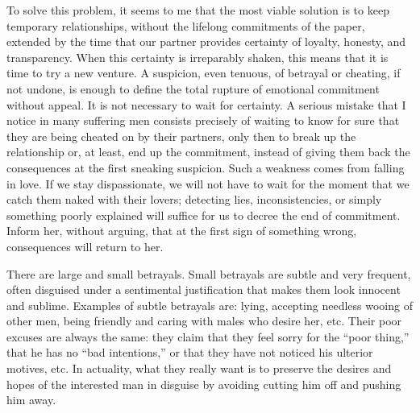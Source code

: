 \par To solve this problem, it seems to me that the most viable solution is to keep temporary relationships, without the lifelong commitments of the paper\footnotemark[22], extended by the time that our partner provides certainty of loyalty, honesty, and transparency\footnotemark[23]. When this certainty is irreparably shaken\footnotemark[24], this means that it is time to try a new venture. A suspicion, even tenuous\footnotemark[25], of betrayal or cheating, if not undone, is enough to define the total rupture of emotional commitment without appeal. It is not necessary to wait for certainty. A serious mistake that I notice in many suffering men consists precisely of waiting to know for sure that they are being cheated on by their partners, only then to break up the relationship or, at least, end up the commitment, instead of giving them back the consequences at the first sneaking suspicion. Such a weakness comes from falling in love. If we stay dispassionate, we will not have to wait for the moment that we catch them naked with their lovers; detecting lies, inconsistencies, or simply something poorly explained will suffice for us to decree the end of commitment. Inform her, without arguing, that at the first sign of something wrong, consequences will return to her.





\par There are large and small betrayals. Small betrayals are subtle and very frequent, often disguised under a sentimental justification that makes them look innocent and sublime. Examples of subtle betrayals are: lying, accepting needless wooing of other men, being friendly and caring with males who desire her, etc. Their poor excuses are always the same: they claim that they feel sorry for the \enquote{poor thing,} that he has no \enquote{bad intentions,} or that they have not noticed his ulterior motives, etc. In actuality, what they really want is to preserve the desires and hopes of the interested man in disguise by avoiding cutting him off and pushing him away.


